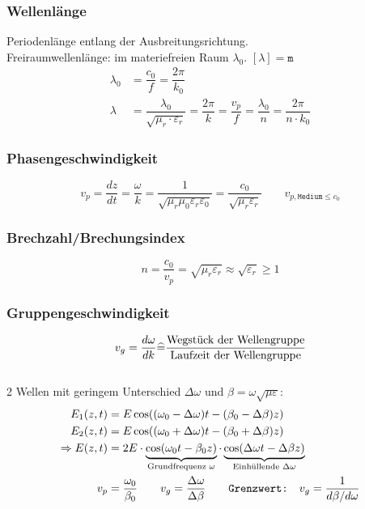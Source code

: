 \subsubsection{Wellenlänge}
Periodenlänge entlang der Ausbreitungsrichtung.\\
Freiraumwellenlänge: im materiefreien Raum $ \lambda_0 $. \qquad $[\lambda] = \texttt{m}$
\begin{align*}
	\lambda_0 & = \dfrac{c_0}{f} = \dfrac{2\pi}{k_0}\\
	\lambda   & = \dfrac{\lambda_0}{\sqrt{\mu_r \cdot \varepsilon_r}} = \dfrac{2 \pi}{k} = \dfrac{v_p}{f} = \dfrac{\lambda_0}{n} = \dfrac{2 \pi}{n \cdot k_0}
\end{align*}

\subsubsection{Phasengeschwindigkeit}
\[
v_p = \dfrac{d z}{d t} = \dfrac{\omega}{k} = \frac{1}{\sqrt{ \mu_r \mu_0 \varepsilon_r \varepsilon_0} } = \frac{c_0}{\sqrt{\mu_r \varepsilon_r}} \qquad v_{p,\texttt{Medium} \leq c_0}
\]

\subsubsection{Brechzahl/Brechungsindex}
\[ 
n = \frac{c_0}{v_p} = \sqrt{\mu_r \varepsilon_r} \approx \sqrt{\varepsilon_r} \geq 1
 \]
\subsubsection{Gruppengeschwindigkeit}
\[
v_g = \dfrac{d \omega}{d k} \widehat{=} \dfrac{\textnormal{Wegstück der Wellengruppe}}{\textnormal{Laufzeit der Wellengruppe}}
\]
\\
2 Wellen mit geringem Unterschied $ \Delta \omega $ und $ \beta =\omega \sqrt{\mu \varepsilon} $:
\begin{align*}
	E_1(z,t)   & = E\cos((\omega_0-\Delta\omega)t-(\beta_0-\Delta\beta)z)     \\
	E_2(z,t)   & = E\cos((\omega_0+\Delta\omega)t-(\beta_0+\Delta\beta)z)     \\
	\Rightarrow E(z,t)     & = 2E\cdot\underbrace{\cos(\omega_0t-\beta_0z)}_{\mathclap{\text{Grundfrequenz $\omega$}}}\cdot\underbrace{\cos(\Delta\omega t-\Delta\beta z)}_{\mathclap{\text{Einhüllende $\Delta\omega$}}} \\
	v_p        & = \frac{\omega_0}{\beta_0}          \qquad                                                                                                                                                         
	v_g        = \frac{\Delta\omega}{\Delta\beta} \qquad \texttt{Grenzwert:} \quad v_g =  \frac{1}{d\beta/d\omega}
\end{align*}


